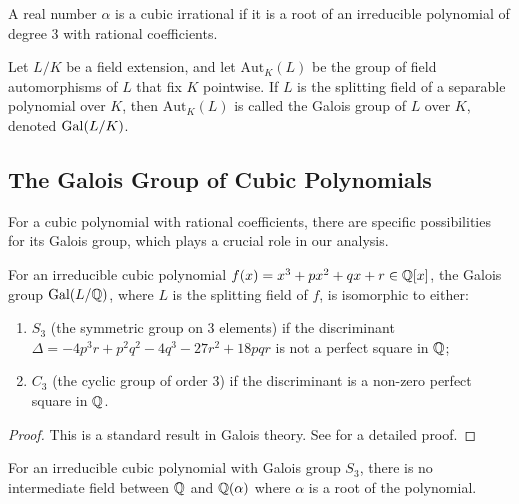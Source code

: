\begin{definition}
A real number $\alpha$ is a cubic irrational if it is a root of an irreducible polynomial of degree 3 with rational coefficients.
\end{definition}

\begin{definition}
Let $L/K$ be a field extension, and let $\text{Aut}_K(L)$ be the group of field 
automorphisms of $L$ that fix $K$ pointwise. If $L$ is the splitting field of a 
separable polynomial over $K$, then $\text{Aut}_K(L)$ is called the Galois group 
of $L$ over $K$, denoted $\operatorname{Gal}(L/K)$.
\end{definition}

\subsection{The Galois Group of Cubic Polynomials}

For a cubic polynomial with rational coefficients, there are specific possibilities for its Galois group, which plays a crucial role in our analysis.

\begin{theorem}\label{thm:cubic_galois}
For an irreducible cubic polynomial $f(x) = x^3 + px^2 + qx + r \in \mathbb{Q}[x]$, the Galois group $\operatorname{Gal}(L/\mathbb{Q})$, where $L$ is the splitting field of $f$, is isomorphic to either:
\begin{enumerate}
    \item $S_3$ (the symmetric group on 3 elements) if the discriminant $\Delta = -4p^3r + p^2q^2 - 4q^3 - 27r^2 + 18pqr$ is not a perfect square in $\mathbb{Q}$;
    \item $C_3$ (the cyclic group of order 3) if the discriminant is a non-zero perfect square in $\mathbb{Q}$.
\end{enumerate}
\end{theorem}

\begin{proof}
This is a standard result in Galois theory. See \cite{Cox2012} for a detailed proof.
\end{proof}

\begin{proposition}\label{prop:no_intermediate_field}
For an irreducible cubic polynomial with Galois group $S_3$, there is no intermediate field between $\mathbb{Q}$ and $\mathbb{Q}(\alpha)$ where $\alpha$ is a root of the polynomial.
\end{proposition}

